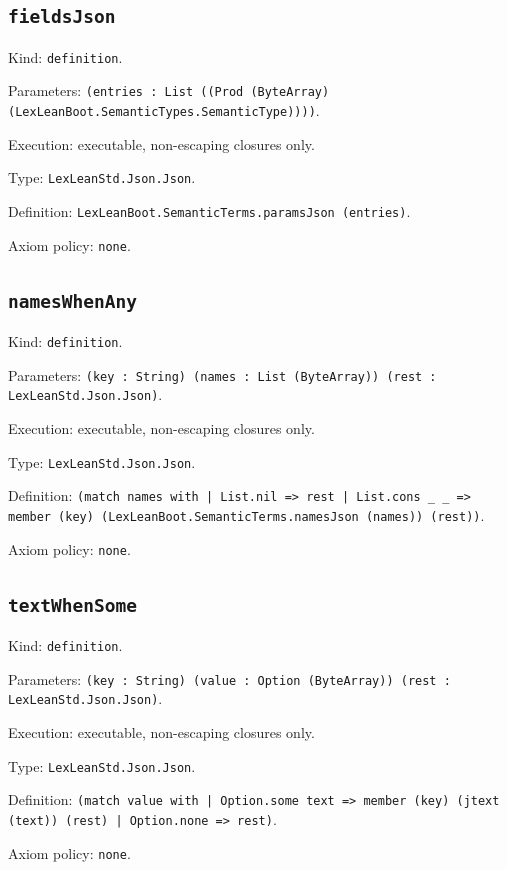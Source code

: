 \documentclass[11pt]{article}
\begin{document}
\subsection*{\texttt{fieldsJson}}
\noindent Kind: \texttt{definition}.\par
\noindent Parameters: \texttt{(entries : List ((Prod (ByteArray) (LexLeanBoot.SemanticTypes.SemanticType))))}.\par
\noindent Execution: executable, non-escaping closures only.\par
\noindent Type: \texttt{LexLeanStd.Json.Json}.\par
\noindent Definition: \texttt{LexLeanBoot.SemanticTerms.paramsJson (entries)}.\par
\noindent Axiom policy: \texttt{none}.\par
\subsection*{\texttt{namesWhenAny}}
\noindent Kind: \texttt{definition}.\par
\noindent Parameters: \texttt{(key : String) (names : List (ByteArray)) (rest : LexLeanStd.Json.Json)}.\par
\noindent Execution: executable, non-escaping closures only.\par
\noindent Type: \texttt{LexLeanStd.Json.Json}.\par
\noindent Definition: \texttt{(match names with | List.nil => rest | List.cons \_ \_ => member (key) (LexLeanBoot.SemanticTerms.namesJson (names)) (rest))}.\par
\noindent Axiom policy: \texttt{none}.\par
\subsection*{\texttt{textWhenSome}}
\noindent Kind: \texttt{definition}.\par
\noindent Parameters: \texttt{(key : String) (value : Option (ByteArray)) (rest : LexLeanStd.Json.Json)}.\par
\noindent Execution: executable, non-escaping closures only.\par
\noindent Type: \texttt{LexLeanStd.Json.Json}.\par
\noindent Definition: \texttt{(match value with | Option.some text => member (key) (jtext (text)) (rest) | Option.none => rest)}.\par
\noindent Axiom policy: \texttt{none}.\par
\end{document}

